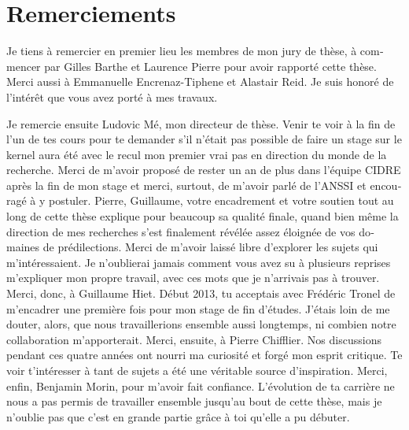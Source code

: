 \chapter*{Remerciements}

\vspace{-0.4cm}

\begin{otherlanguage}{french}
  Je tiens à remercier en premier lieu les membres de mon jury de thèse, à
  commencer par Gilles Barthe et Laurence Pierre pour avoir rapporté cette
  thèse. Merci aussi à Emmanuelle Encrenaz-Tiphene et Alastair Reid. Je suis
  honoré de l’intérêt que vous avez porté à mes travaux.

  Je remercie ensuite Ludovic Mé, mon directeur de thèse. Venir te voir à la fin
  de l’un de tes cours pour te demander s’il n’était pas possible de faire un
  stage \og{}sur le kernel\fg{} aura été avec le recul mon premier vrai pas en
  direction du monde de la recherche. Merci de m’avoir proposé de rester un an
  de plus dans l’équipe CIDRE après la fin de mon stage et merci, surtout, de
  m’avoir parlé de l’ANSSI et encouragé à y postuler.
  Pierre, Guillaume, votre encadrement et votre soutien tout au long de cette
  thèse explique pour beaucoup sa qualité finale, quand bien même la direction
  de mes recherches s’est finalement révélée assez éloignée de vos domaines de
  prédilections. Merci de m’avoir laissé libre d’explorer les sujets qui
  m’intéressaient. Je n’oublierai jamais comment vous avez su à plusieurs
  reprises m’expliquer mon propre travail, avec ces mots que je n'arrivais pas à
  trouver.
  Merci, donc, à Guillaume Hiet. Début 2013, tu acceptais avec Frédéric Tronel
  de m’encadrer une première fois pour mon stage de fin d’études. J’étais loin
  de me douter, alors, que nous travaillerions ensemble aussi longtemps, ni
  combien notre collaboration m’apporterait.
  Merci, ensuite, à Pierre Chifflier. Nos discussions pendant ces quatre années
  ont nourri ma curiosité et forgé mon esprit critique. Te voir t’intéresser à
  tant de sujets a été une véritable source d’inspiration.
  Merci, enfin, Benjamin Morin, pour m'avoir fait confiance. L’évolution de ta
  carrière ne nous a pas permis de travailler ensemble jusqu’au bout de cette
  thèse, mais je n’oublie pas que c’est en grande partie grâce à toi qu’elle a
  pu débuter.


\end{otherlanguage}
